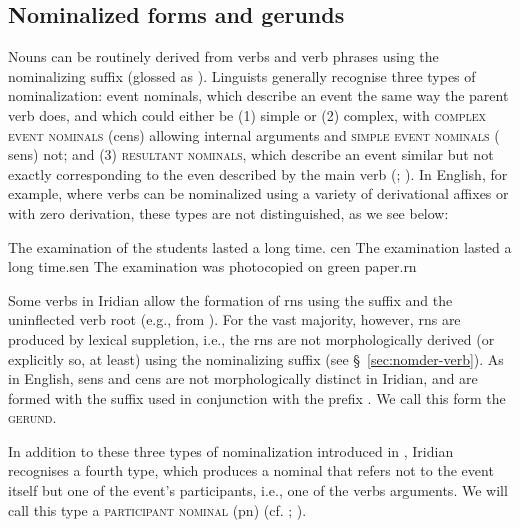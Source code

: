 \subsection{Nominalized forms and
gerunds}\label{nom-morph}

Nouns can be routinely derived from verbs and verb phrases using the
nominalizing suffix  (glossed as \Nz{}). Linguists generally recognise
three types of nominalization: event nominals, which describe an event the same
way the parent verb does, and which could either be (1) simple or (2) complex,
with {\scshape complex event nominals} ({\sc cen}s) allowing
internal arguments and {\scshape simple event nominals} ({\sc
sen}s) not; and (3) {\scshape resultant
nominals}, which describe an event similar
but not exactly corresponding to the even described by the main verb
(\cite{grimshaw1990}; \cite{moulton2014}). In English, for
example, where verbs can be nominalized using a variety of derivational affixes
or with zero derivation, these types are not distinguished, as we see below:

\pex[interpartskip=0pt]
	\a The examination of the students lasted a long time. \hfill {\sc cen}
	\a The examination lasted a long time.\hfill {\sc sen}
	\a The examination was photocopied on green paper.\hfill {\sc rn}\\
\xe

Some verbs in Iridian allow the formation of {\sc rn}s using the suffix
 and the uninflected verb root (e.g.,  from
). For the vast majority, however, {\sc rn}s are produced
by lexical suppletion, i.e., the {\sc rn}s are not morphologically derived (or
explicitly so, at least) using the nominalizing suffix (see
\S~\ref{sec:nomder-verb}). As in English, {\sc sen}s and {\sc cen}s are not
morphologically distinct in Iridian, and are formed with the suffix 
used in conjunction with the prefix . We call this form the
{\scshape gerund}.

In addition to these three types of nominalization introduced in
\textcite{grimshaw1990}, Iridian recognises a fourth type, which produces a
nominal that refers not to the event itself but one of the event's participants,
i.e., one of the verbs arguments. We will call this type a {\scshape participant
nominal} ({\sc pn}) (cf. \cite[400-5]{schackow2015}; \cite[297-8]{okuna}).

